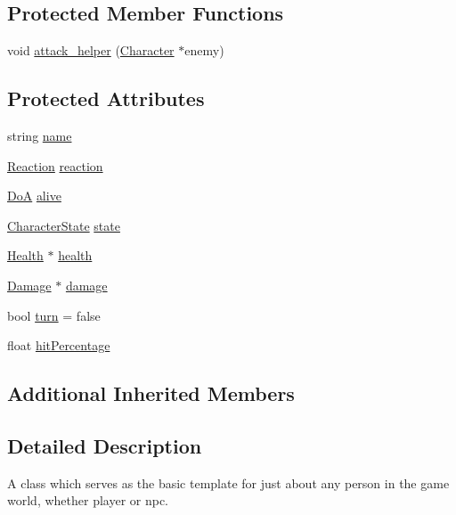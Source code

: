 \subsection*{Protected Member Functions}
\begin{DoxyCompactItemize}
\item 
void \hyperlink{class_character_aa3a40043d1f3c27edd921aa0e0ef7616}{attack\-\_\-helper} (\hyperlink{class_character}{Character} $\ast$enemy)
\end{DoxyCompactItemize}
\subsection*{Protected Attributes}
\begin{DoxyCompactItemize}
\item 
string \hyperlink{class_character_a2d423654566d1bf2160fef74bf04cc84}{name}
\item 
\hyperlink{_character_data_8h_a0e5ce1612c1e71823c97a9cd734de339}{Reaction} \hyperlink{class_character_a579933775b2e4e97465bacb09c4e87f5}{reaction}
\item 
\hyperlink{_character_data_8h_acbff4d7298e294294555d39178aad448}{Do\-A} \hyperlink{class_character_ac83b99be690bb41b7fae53e9457838c6}{alive}
\item 
\hyperlink{_character_data_8h_aacbb008a93d24b04a8779bbdbd8880b5}{Character\-State} \hyperlink{class_character_ac20f1ebda238017ddc245ecdce827037}{state}
\item 
\hyperlink{struct_health}{Health} $\ast$ \hyperlink{class_character_ae8c0d82624dc3a171e2c3b42c699151e}{health}
\item 
\hyperlink{struct_damage}{Damage} $\ast$ \hyperlink{class_character_ae6a140637ffe5004179d90a0e04a411b}{damage}
\item 
bool \hyperlink{class_character_a5195d893143824d0ba34180a94229543}{turn} = false
\item 
float \hyperlink{class_character_a6328c239882a3c7794332d24d100e02d}{hit\-Percentage}
\end{DoxyCompactItemize}
\subsection*{Additional Inherited Members}


\subsection{Detailed Description}
A class which serves as the basic template for just about any person in the game world, whether player or npc. 

